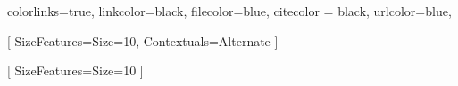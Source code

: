 

\setdefaultlanguage[spelling=modern]{russian}
    
\setmonofont{Times New Roman}
\setmainfont{Times New Roman} 
\newfontfamily{}





\linespread{1.5} %


\setlength{\parindent}{1.25cm} %





\graphicspath{ {./Images/} }

\makeatletter
\renewenvironment{titlepage} {
	\thispagestyle{empty}
}


\hypersetup{ 
     colorlinks=true, 
     linkcolor=black, 
     filecolor=blue, 
     citecolor = black,       
     urlcolor=blue, 
}
     
\renewcommand{\footnotelayout}{
  \fontsize{12}{14}\selectfont
}
    




\setmonofont{JetBrains Mono}[
	SizeFeatures={Size=10},
	Contextuals=Alternate
]

\newfontfamily{}[
	SizeFeatures={Size=10}
]

\emergencystretch=25pt


\newenvironment{code}{\captionsetup{type=listing}}{}


